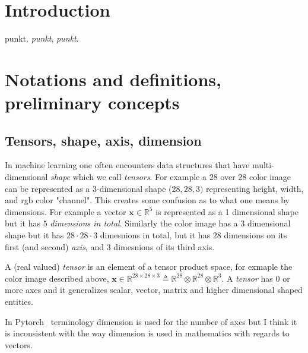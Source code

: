 \documentclass[11pt, a4paper]{report}
\theoremstyle{plain}
\theoremstyle{definition}
\theoremstyle{remark}
\newcommand{\R}{\mathbb{R}}
\newcommand{\x}{\mathbf{x}}
\begin{document}
\listoftables

\listoffigures

\tableofcontents

\chapter{Introduction} punkt. \emph{punkt}, \textit{punkt}.

\chapter{Notations and definitions, preliminary concepts}


\section{Tensors, shape, axis, dimension}
In machine learning one often encounters data structures that have
multi-dimensional \emph{shape} which we call \emph{tensors}.
For example a 28 over 28 color image can be represented as
a 3-dimensional shape ($28, 28, 3)$ representing height, width, and rgb
color "channel". This creates some confusion as to what one means by dimensions.
For example a vector $\x \in \R^5$ is represented as a 1 dimensional shape
but it has $5$ \emph{dimensions in total}. Similarly the color image has a $3$ dimensional shape
but it has $28 \cdot 28 \cdot 3$ dimesnions in total, 
but it has $28$ dimensions on its first (and second) \emph{axis}, and $3$ dimesnions of
its third axis. 

A (real valued) \emph{tensor} is an element of a tensor product space, for exmaple
the color image described above,
$\x \in  \R^{28 \times 28 \times 3} 
\triangleq \R^{28} \otimes \R^{28} \otimes \R^3$. 
A \emph{tensor} has $0$ or more axes and it generalizes 
scalar, vector, matrix and higher dimensional shaped entities.

In Pytorch~\cite{pytorch2018pytorch} terminology dimension
is used for the number of axes but I think it is
inconsistent with the way dimension is used in mathematics with regards to vectors.
\end{document}
